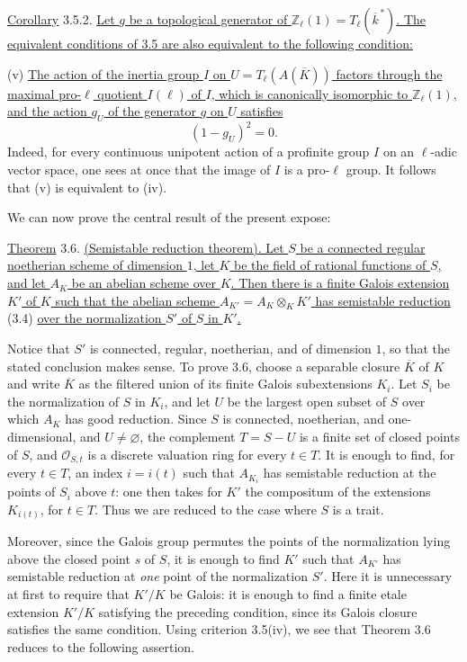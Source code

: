 \medskip
\noindent
\underline{Corollary} 3.5.2. \underline{Let $g$ be a topological generator
of $\mathbb Z_\ell(1)=T_\ell(\overline k^{\,*})$.  The equivalent conditions
of 3.5 are also equivalent to the following condition:}

\smallskip
\noindent
(v) \underline{The action of the inertia group $I$ on
$U=T_\ell(A(\overline K))$ factors through the maximal pro-$\ell$ quotient
$I(\ell)$ of $I$, which is canonically isomorphic to $\mathbb Z_\ell(1)$,
and the action $g_U$ of the generator $g$ on $U$ satisfies}
\begin{equation}\tag{3.5.3}
 (1-g_U)^2=0.
\end{equation}
Indeed, for every continuous unipotent action of a profinite group $I$ on
an $\ell$-adic vector space, one sees at once that the image of $I$ is a
pro-$\ell$ group.  It follows that (v) is equivalent to (iv).

We can now prove the central result of the present expose:

\medskip
\noindent
\underline{Theorem} 3.6. \underline{(Semistable reduction theorem).  Let
$S$ be a connected regular noetherian scheme of dimension $1$, let $K$ be
the field of rational functions of $S$, and let $A_K$ be an abelian scheme
over $K$.  Then there is a finite Galois extension $K'$ of $K$ such that
the abelian scheme $A_{K'}=A_K\otimes_KK'$ has semistable reduction} (3.4)
\underline{over the normalization $S'$ of $S$ in $K'$.}

Notice that $S'$ is connected, regular, noetherian, and of dimension $1$,
so that the stated conclusion makes sense.  To prove 3.6, choose a
separable closure $\overline K$ of $K$ and write $\overline K$ as the
filtered union of its finite Galois subextensions $K_i$.  Let $S_i$ be the
normalization of $S$ in $K_i$, and let $U$ be the largest open subset of
$S$ over which $A_K$ has good reduction.  Since $S$ is connected,
noetherian, and one-dimensional, and $U\ne\varnothing$, the complement
$T=S-U$ is a finite set of closed points of $S$, and
$\mathcal O_{S,t}$ is a discrete valuation ring for every $t\in T$.  It is
enough to find, for every $t\in T$, an index $i=i(t)$ such that $A_{K_i}$
has semistable reduction at the points of $S_i$ above $t$: one then takes
for $K'$ the compositum of the extensions $K_{i(t)}$, for $t\in T$.
Thus we are reduced to the case where $S$ is a trait.

Moreover, since the Galois group permutes the points of the normalization
lying above the closed point $s$ of $S$, it is enough to find $K'$ such
that $A_{K'}$ has semistable reduction at \emph{one} point of the
normalization $S'$.  Here it is unnecessary at first to require that
$K'/K$ be Galois: it is enough to find a finite etale extension $K'/K$
satisfying the preceding condition, since its Galois closure satisfies the
same condition.  Using criterion 3.5(iv), we see that Theorem 3.6 reduces
to the following assertion.

